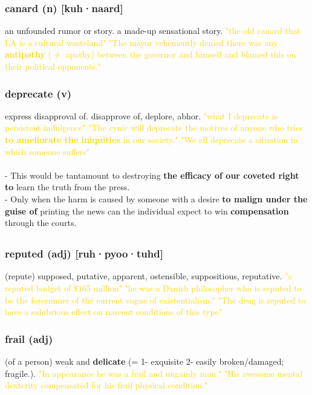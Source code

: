 \documentclass{proc}
\begin{document}
	\subsubsection{\textcolor{brickred}{canard} (n) [kuh·naard]}
	an unfounded rumor or story. a made-up sensational story.
	\textcolor{gold}{"the old canard that LA is a cultural wasteland" "The mayor vehemently denied there was any \textbf{antipathy} ($\neq$ apathy) between the governor and himself and blamed this on their political opponents."}
	
	\subsubsection{\textcolor{brickred}{deprecate} (v)}
	express disapproval of. disapprove of, deplore, abhor.
	\textcolor{gold}{"what I deprecate is persistent indulgence" "The cynic will deprecate the motives of anyone who tries \textbf{to ameliorate the iniquities} in our society." "We all deprecate a situation in which someone suffers"}\\\\
	- This would be tantamount to destroying \textbf{the efficacy of our coveted right to} learn the truth from the press.\\
	- Only when the harm is caused by someone with a desire \textbf{to malign under the guise of} printing the news can the individual expect to win \textbf{compensation} through the courts.
	
	\newpage
	\subsection{}
	\subsubsection{\textcolor{brickred}{reputed} (adj) [ruh·pyoo·tuhd]}
	(repute) supposed,
	putative,
	apparent,
	ostensible,
	suppositious,
	reputative.
	\textcolor{gold}{"a reputed budget of \$165 million" "he was a Danish philosopher who is reputed to be the forerunner of the current vogue of existentialism." "The drug is reputed to have a salubrious effect on nascent conditions of this type"}
	
	\subsubsection{\textcolor{brickred}{frail} (adj)}
	(of a person) weak and \textbf{delicate} (= 1- exquisite 2- easily broken/damaged; fragile.).
	\textcolor{gold}{ "In appearance he was a frail and ungainly man." "His awesome mental dexterity compensated for his frail physical condition."}
	
\end{document}
